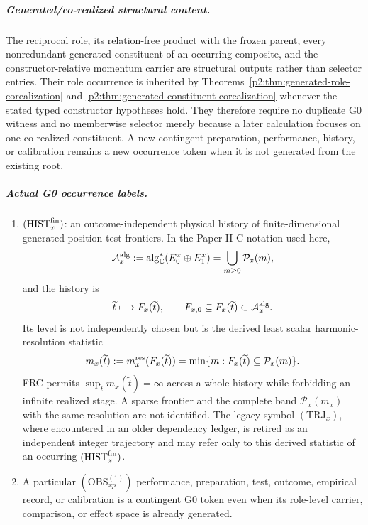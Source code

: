 \documentclass[12pt,a4paper]{article}
\begin{document}
\begin{definition}
\subparagraph{Generated/co-realized structural content.}
The reciprocal role, its relation-free product with the frozen parent, every
nonredundant generated constituent of an occurring composite, and the
constructor-relative momentum carrier are structural outputs rather than
selector entries.  Their role occurrence is inherited by
Theorems~\ref{p2:thm:generated-role-corealization} and
\ref{p2:thm:generated-constituent-corealization} whenever the stated typed
constructor hypotheses hold.  They therefore require no duplicate G0 witness
and no memberwise selector merely because a later calculation focuses on one
co-realized constituent.  A new contingent preparation, performance, history,
or calibration remains a new occurrence token when it is not generated from
the existing root.

\subparagraph{Actual G0 occurrence labels.}
\begin{enumerate}[label=(\roman*),leftmargin=2em,resume]
\item \((\mathrm{HIST}_x^{\rm fin})\): an outcome-independent physical
history of finite-dimensional generated position-test frontiers.  In the
Paper-II-C notation used here,
\[
 \mathcal A_x^{\rm alg}
 :=\operatorname{alg}_{\mathbb C}^{*}(E_0^x\oplus E_1^x)
 =\bigcup_{m\ge0}\mathcal P_x(m),
\]
and the history is
\[
  \widetilde t\longmapsto F_x(\widetilde t),
  \qquad
  F_{x,0}\subseteq F_x(\widetilde t)\subset\mathcal A_x^{\rm alg}.
\]
Its level is not independently chosen but is the derived least scalar
harmonic-resolution statistic
\[
  m_x(\widetilde t)
  :=m_x^{\rm res}(F_x(\widetilde t))
  =\min\{m:F_x(\widetilde t)\subseteq\mathcal P_x(m)\}.
\]
FRC permits \(\sup_{\widetilde t}m_x(\widetilde t)=\infty\) across a whole
history while forbidding an infinite realized stage.  A sparse frontier and
the complete band \(\mathcal P_x(m_x)\) with the same resolution are not
identified.  The legacy symbol \((\mathrm{TRJ}_x)\), where encountered in an
older dependency ledger, is retired as an independent integer trajectory and
may refer only to this derived statistic of an occurring
\((\mathrm{HIST}_x^{\rm fin})\).
\item A particular \((\mathrm{OBS}^{(1)}_{xp})\) performance, preparation,
test, outcome, empirical record, or calibration is a contingent G0 token even
when its role-level carrier, comparison, or effect space is already generated.
\end{enumerate}


\end{definition}
\end{document}
